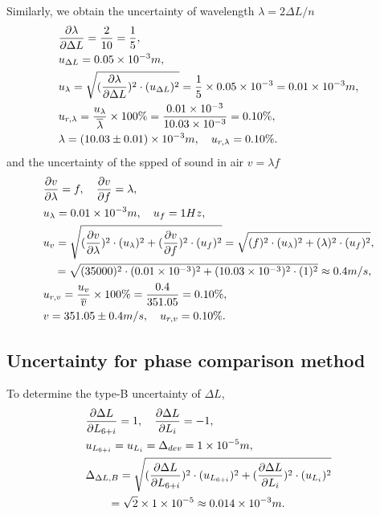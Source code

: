     Similarly, we obtain the uncertainty of wavelength $\lambda=2\Delta L/n$
    \[
    \begin{split}
        &\frac{\partial \lambda}{\partial \Delta L}=\frac{2}{10}=\frac{1}{5},\\
        &u_{\Delta L}=0.05\times10^{-3}m,\\
        &u_{\lambda}=\sqrt{(\frac{\partial \lambda}{\partial \Delta L})^2\cdot (u_{\Delta L})^2}=\frac{1}{5}\times 0.05\times10^{-3}=0.01\times10^{-3}m,\\
        &u_{r,\lambda}=\frac{u_{\lambda}}{\overline{\lambda}}\times 100\%=\frac{0.01\times10^{-3}}{10.03\times10^{-3}}=0.10\%,\\
        &\lambda=(10.03\pm0.01)\times10^{-3}m,\quad u_{r,\lambda}=0.10\%.
    \end{split}
    \]
    and the uncertainty of the spped of sound in air $v=\lambda f$
    \[
    \begin{split}
        &\frac{\partial v}{\partial \lambda}=f,\quad \frac{\partial v}{\partial f}=\lambda,\\
        &u_{\lambda}=0.01\times10^{-3}m,\quad u_{f}=1Hz,\\
        &u_{v}=\sqrt{(\frac{\partial v}{\partial \lambda})^2\cdot (u_{\lambda})^2+(\frac{\partial v}{\partial f})^2\cdot (u_{f})^2}=\sqrt{(f)^2\cdot (u_{\lambda})^2+(\lambda)^2\cdot (u_{f})^2},\\
        &\quad =\sqrt{(35000)^2\cdot(0.01\times10^{-3})^2+(10.03\times10^{-3})^2\cdot(1)^2}
        \approx0.4m/s,\\
        &u_{r,v}=\frac{u_v}{\overline{v}}\times 100\%=\frac{0.4}{351.05}=0.10\%,\\
        &v=351.05\pm0.4 m/s,\quad u_{r,v}=0.10\%.
    \end{split}
    \]

\subsection{Uncertainty for phase comparison method}
    To determine the type-B uncertainty of $\Delta L$,
    \[
    \begin{split}
        &\frac{\partial \Delta L}{\partial L_{6+i}}=1,\quad \frac{\partial \Delta L}{\partial L_i}=-1,\\
        &u_{L_{6+i}}=u_{L_i}=\Delta_{dev}=1\times10^{-5}m,\\
        &\Delta_{\Delta L,B}=\sqrt{(\frac{\partial \Delta L}{\partial L_{6+i}})^2\cdot (u_{L_{6+i}})^2+(\frac{\partial \Delta L}{\partial L_i})^2\cdot (u_{L_i})^2}\\
        &\quad\quad =\sqrt{2}\times 1\times10^{-5}\approx0.014\times10^{-3}m.\\
    \end{split}
    \]

